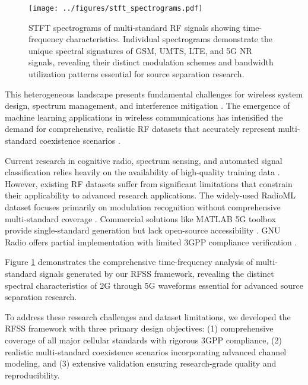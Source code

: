 \documentclass[twocolumn]{article}
\begin{document}
\begin{figure}[t]
\centering
\texttt{[image: ../figures/stft\_spectrograms.pdf]}
\caption{STFT spectrograms of multi-standard RF signals showing time-frequency characteristics. Individual spectrograms demonstrate the unique spectral signatures of GSM, UMTS, LTE, and 5G NR signals, revealing their distinct modulation schemes and bandwidth utilization patterns essential for source separation research.}
\label{fig:signal_spectrograms}
\end{figure}

This heterogeneous landscape presents fundamental challenges for wireless system design, spectrum management, and interference mitigation \cite{haykin2005cognitive,goldsmith2009breaking}. The emergence of machine learning applications in wireless communications has intensified the demand for comprehensive, realistic RF datasets that accurately represent multi-standard coexistence scenarios \cite{oshea2017introduction,west2017deep}.

Current research in cognitive radio, spectrum sensing, and automated signal classification relies heavily on the availability of high-quality training data \cite{oshea2018over,oshea2016convolutional,rajendran2018deep}. However, existing RF datasets suffer from significant limitations that constrain their applicability to advanced research applications. The widely-used RadioML dataset focuses primarily on modulation recognition without comprehensive multi-standard coverage \cite{oshea2016radio}. Commercial solutions like MATLAB 5G toolbox provide single-standard generation but lack open-source accessibility \cite{west2017deep}. GNU Radio offers partial implementation with limited 3GPP compliance verification \cite{blossom2004gnu}.

Figure \ref{fig:signal_spectrograms} demonstrates the comprehensive time-frequency analysis of multi-standard signals generated by our RFSS framework, revealing the distinct spectral characteristics of 2G through 5G waveforms essential for advanced source separation research.

To address these research challenges and dataset limitations, we developed the RFSS framework with three primary design objectives: (1) comprehensive coverage of all major cellular standards with rigorous 3GPP compliance, (2) realistic multi-standard coexistence scenarios incorporating advanced channel modeling, and (3) extensive validation ensuring research-grade quality and reproducibility.
\end{document}
